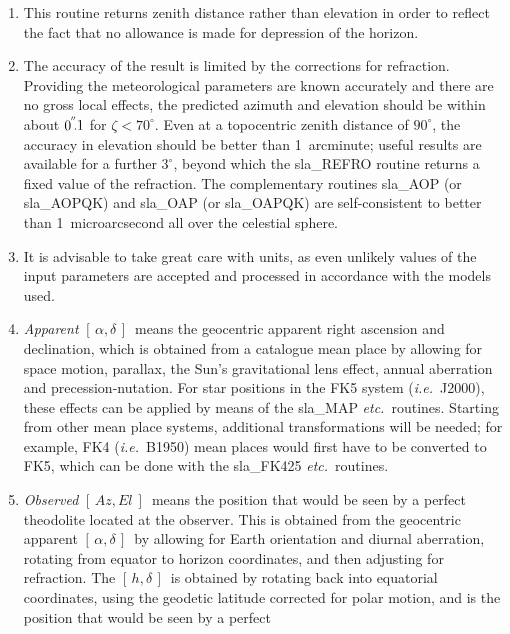 \documentclass[11pt,twoside]{article}
\newcommand{\radec}     {$[\,\alpha,\delta\,]$}
\newcommand{\hadec}     {$[\,h,\delta\,]$}
\newcommand{\azel}      {$[\,Az,El~]$}
\newcommand{\arcsec}[2] {\arcseci{#1}$\hspace{-0.4em}.#2$}
\newcommand{\arcsec}[2] {
      {$#1\hspace{-0.05em}^{'\hspace{-0.1em}'}\hspace{-0.4em}.#2$}
   }
\newcommand{\arcseci}[1] {$#1\hspace{-0.05em}$\raisebox{-0.5ex}
                         {$^{'\hspace{-0.1em}'}$}}
\renewcommand{\arcseci}[1] {$#1\hspace{-0.05em}^{'\hspace{-0.1em}'}$}
\begin{document}
{
 \begin{enumerate}
  \item This routine returns zenith distance rather than elevation
        in order to reflect the fact that no allowance is made for
        depression of the horizon.
  \item The accuracy of the result is limited by the corrections for
        refraction.  Providing the meteorological parameters are
        known accurately and there are no gross local effects, the
        predicted azimuth and elevation should be within about
        \arcsec{0}{1} for $\zeta<70^{\circ}$.  Even
        at a topocentric zenith distance of
        $90^{\circ}$, the accuracy in elevation should be better than
        1~arcminute;  useful results are available for a further
        $3^{\circ}$, beyond which the sla\_REFRO routine returns a
        fixed value of the refraction.  The complementary
        routines sla\_AOP (or sla\_AOPQK) and sla\_OAP (or sla\_OAPQK)
        are self-consistent to better than 1~microarcsecond all over
        the celestial sphere.
  \item It is advisable to take great care with units, as even
        unlikely values of the input parameters are accepted and
        processed in accordance with the models used.
  \item {\it Apparent}\/ \radec\ means the geocentric apparent right ascension
        and declination, which is obtained from a catalogue mean place
        by allowing for space motion, parallax, the Sun's gravitational
        lens effect, annual aberration and precession-nutation.  For
        star positions in the FK5 system ({\it i.e.}\ J2000), these effects can
        be applied by means of the sla\_MAP {\it etc.}\ routines.  Starting from
        other mean place systems, additional transformations will be
        needed;  for example, FK4 ({\it i.e.}\ B1950) mean places would first
        have to be converted to FK5, which can be done with the
        sla\_FK425 {\it etc.}\ routines.
  \item {\it Observed}\/ \azel\ means the position that would be seen by a
        perfect theodolite located at the observer.  This is obtained
        from the geocentric apparent \radec\ by allowing for Earth
        orientation and diurnal aberration, rotating from equator
        to horizon coordinates, and then adjusting for refraction.
        The \hadec\ is obtained by rotating back into equatorial
        coordinates, using the geodetic latitude corrected for polar
        motion, and is the position that would be seen by a perfect

\end{enumerate}}
\end{document}
